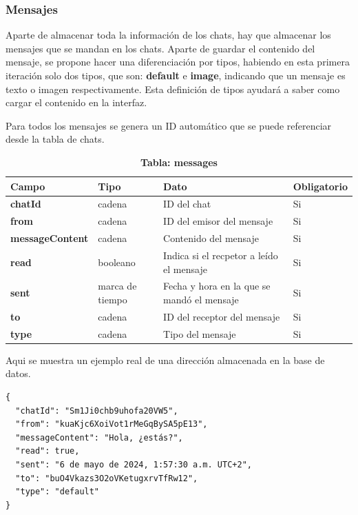 \documentclass[a4paper, 12pt]{article}
\begin{document}
\subsubsection{Mensajes}

Aparte de almacenar toda la información de los chats, hay que almacenar los mensajes que se mandan en los chats. Aparte de guardar el contenido del mensaje, se propone hacer una diferenciación por tipos, habiendo en esta primera iteración solo dos tipos, que son: \textbf{default} e \textbf{image}, indicando que un mensaje es texto o imagen respectivamente. Esta definición de tipos ayudará a saber como cargar el contenido en la interfaz.

Para todos los mensajes se genera un ID automático que se puede referenciar desde la tabla de chats.

\begin{table}[H]
\captionsetup{justification=raggedright,singlelinecheck=false}
\caption{\textbf{Tabla: messages}}
\label{tab:messages}
	\begin{tabular}{|m{3.2cm}|m{2cm}|m{5cm}|m{3cm}|}
	\hline
	\textbf{Campo} & \textbf{Tipo} & \textbf{Dato} & \textbf{Obligatorio} \\ 
	\hline
	\textbf{chatId} & cadena & ID del chat & Si \\ 
	\hline
	\textbf{from} & cadena & ID del emisor del mensaje & Si \\ 
	\hline
	\textbf{messageContent} & cadena & Contenido del mensaje & Si \\ 
	\hline
	\textbf{read} & booleano & Indica si el recpetor a leído el mensaje & Si \\ 
	\hline
	\textbf{sent} & marca de tiempo & Fecha y hora en la que se mandó el mensaje & Si \\ 
	\hline
	\textbf{to} & cadena & ID del receptor del mensaje & Si \\ 
	\hline
	\textbf{type} & cadena & Tipo del mensaje & Si \\ 
	\hline
	\end{tabular}
\end{table}

Aqui se muestra un ejemplo real de una dirección almacenada en la base de datos.

\begin{verbatim}
{
  "chatId": "Sm1Ji0chb9uhofa20VW5",
  "from": "kuaKjc6XoiVot1rMeGqBySA5pE13",
  "messageContent": "Hola, ¿estás?",
  "read": true,
  "sent": "6 de mayo de 2024, 1:57:30 a.m. UTC+2",
  "to": "buO4Vkazs3O2oVKetugxrvTfRw12",
  "type": "default"
}
\end{verbatim}
\end{document}
